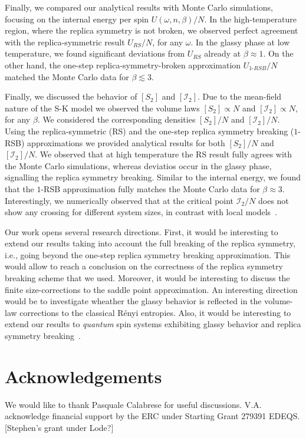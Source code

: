 \documentclass[twocolumn,superscriptaddress,prb,10pt]{revtex4-1}
\begin{document}
Finally, we compared our analytical results with Monte Carlo simulations, focusing on the 
internal energy per spin $U(\omega,n,\beta)/N$. In the high-temperature region, where the 
replica symmetry is not broken, we observed perfect agreement with the replica-symmetric 
result $U_{RS}/N$, for any $\omega$. In the glassy phase at low temperature, we found 
significant deviations from $U_{RS}$ already at $\beta\approx 1$. On the other hand,  
the one-step replica-symmetry-broken approximation $U_{1\textrm{-}RSB}/N$ matched the 
Monte Carlo data for $\beta\lesssim 3$. 

Finally, we discussed the behavior of $[S_2]$ and $[{\mathcal I}_2]$. Due to the mean-field 
nature of the S-K model we observed the volume laws $[S_2]\propto N$ and 
$[{\mathcal I}_2]\propto N$, for any $\beta$. We considered the corresponding densities 
$[S_2]/N$ and $[{\mathcal I}_2]/N$. Using the replica-symmetric (RS) and the one-step 
replica symmetry breaking ($1$-RSB) approximations we provided analytical results for 
both $[S_2]/N$ and $[{\mathcal I}_2]/N$. We observed that at high temperature the 
RS result fully agrees with the Monte Carlo simulations, whereas deviatios occur in the 
glassy phase, signalling the replica symmetry breaking. Similar to the internal energy, 
we found that the $1$-RSB approximation fully matches the Monte Carlo data for $\beta\approx 3$.
Interestingly, we numerically observed that at the critical point ${\mathcal I}_2/N$ 
does not show any crossing for different system sizes, in contrast with local 
models~\cite{jaconis-2013}.

Our work opens several research directions. First, it would be interesting to extend our 
results taking into account the full breaking of the replica symmetry, i.e., going beyond 
the one-step replica symmetry breaking approximation. This would allow to reach a conclusion 
on the correctness of the replica symmetry breaking scheme that we used. Moreover, it 
would be interesting to discuss the finite size-corrections to the saddle 
point approximation. An interesting direction would be to investigate wheather the 
glassy behavior is reflected in the volume-law corrections to the classical R\'enyi 
entropies. Also, it would be interesting to extend our results to {\it quantum} spin 
systems exhibiting glassy behavior and replica symmetry breaking~\cite{read-1995,
andreanov-2012}. 

\section{Acknowledgements}
We would like to thank Pasquale Calabrese for useful discussions. V.A.  acknowledge 
financial support by the ERC under Starting Grant 279391 EDEQS. 
[Stephen's grant under Lode?]
\end{document}
